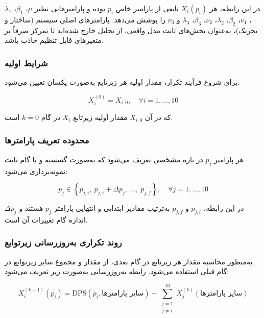 در این رابطه، هر $X_i(p_i)$ تابعی از پارامتر خاص $p_i$ بوده و پارامترهایی نظیر $\mu$، $\beta_1$، $\lambda_1$، $\nu_1$، $\beta_2$، $\lambda_2$، $\nu_2$، $\beta_3$، $\lambda_3$ و $\nu_3$ را پوشش می‌دهد. پارامترهای اصلی سیستم (ساختار و تحریک)، به‌عنوان بخش‌های ثابت مدل واقعی، از تحلیل خارج شده‌اند تا تمرکز صرفاً بر متغیرهای قابل تنظیم جاذب باشد.

\subsubsection{شرایط اولیه}

برای شروع فرآیند تکرار، مقدار اولیه هر زیرتابع به‌صورت یکسان تعیین می‌شود:

\begin{equation}
X_i^{(0)} = X_{i,0},\quad \forall i = 1,\ldots,10
\end{equation}

که در آن $X_{i,0}$ مقدار اولیه زیرتابع $X_i$ در گام $k=0$ است.

\subsubsection{محدوده تعریف پارامترها}

هر پارامتر $p_j$ در بازه مشخصی تعریف می‌شود که به‌صورت گسسته و با گام ثابت نمونه‌برداری می‌شود:

\begin{equation}
p_j \in \left\{p_{j,i},\ p_{j,i}+\Delta p_j,\ \ldots,\ p_{j,f}\right\},\quad \forall j = 1,\ldots,10
\end{equation}

در این رابطه، $p_{j,i}$ و $p_{j,f}$ به‌ترتیب مقادیر ابتدایی و انتهایی پارامتر $p_j$ هستند و $\Delta p_j$ اندازه گام تغییرات آن است.

\subsubsection{روند تکراری به‌روزرسانی زیرتوابع}

به‌منظور محاسبه مقدار هر زیرتابع در گام بعدی، از مقدار  و مجموع سایر زیرتوابع در گام قبلی استفاده می‌شود. رابطه به‌روزرسانی به‌صورت زیر تعریف می‌شود:

\begin{equation}
X_i^{(k+1)}(p_i) = \mathrm{DPS}(p_i,\text{سایر پارامترها}) - \sum_{\substack{j=1 \\ j \ne i}}^{10} X_j^{(k)}(\text{سایر پارامترها})
\end{equation}

